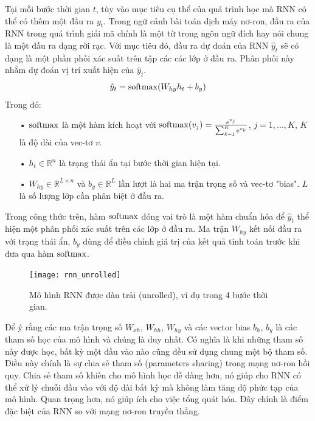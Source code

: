 Tại mỗi bước thời gian $t$, tùy vào mục tiêu cụ thể của quá trình học mà RNN có thể có thêm một đầu ra $y_t$. Trong ngữ cảnh bài toán dịch máy nơ-ron, đầu ra của RNN trong quá trình giải mã chính là một từ trong ngôn ngữ đích hay nói chung là một đầu ra dạng rời rạc. Với mục tiêu đó, đầu ra dự đoán của RNN $\hat{y}_t$ sẽ có dạng là một phần phối xác suất trên tập các các lớp ở đầu ra. Phân phối này nhằm dự đoán vị trí xuất hiện của $\hat{y}_t$.
\begin{equation} \label{rnnOuputSoftmaxDistribution}
	\hat{y}_t = \mathrm{softmax}(W_{hy}h_t + b_y)
\end{equation}
Trong đó:
\begin{itemize}
	\item[•] $\mathrm{softmax}$ là một hàm kích hoạt với $\mathrm{softmax}(v_j) = \frac{e^{v_j}}{\sum_{k=1}^{K}e^{v_k}}$, $j = 1,...,K$, $K$ là độ dài của vec-tơ $v$.
	\item[•] $h_{t} \in \mathbb{R}^n$ là trạng thái ẩn tại bước thời gian hiện tại.
	\item[•] $W_{hy} \in \mathbb{R}^{L \times n}$ và $b_y \in \mathbb{R}^L$ lần lượt là hai ma trận trọng số và vec-tơ "bias". $L$ là số lượng lớp cần phân biệt ở đầu ra.
\end{itemize}

Trong công thức trên, hàm $\mathrm{softmax}$ đóng vai trò là một hàm chuẩn hóa để $\hat{y}_t$ thể hiện một phân phối xác suất trên các lớp ở đầu ra. Ma trận $W_{hy}$ kết nối đầu ra với trạng thái ẩn, $b_y$ dùng để điều chỉnh giá trị của kết quả tính toán trước khi đưa qua hàm $\mathrm{softmax}$.

\begin{figure}
	\centering
	\texttt{[image: rnn\_unrolled]}
	\caption[Mô hình RNN dạng dàn trải]{Mô hình RNN được dàn trải (unrolled), ví dụ trong 4 bước thời gian.}
	\label{fig_rnn_unrolled}
\end{figure}

Để ý rằng các ma trận trọng số $W_{xh}$, $W_{hh}$, $W_{hy}$ và các vector bias $b_h$, $b_y$ là các tham số học của mô hình và chúng là duy nhất. Có nghĩa là khi những tham số này được học, bất kỳ một đầu vào nào cũng đều sử dụng chung một bộ tham số. Điều này chính là sự chia sẻ tham số (parameters sharing) trong mạng nơ-ron hồi quy. Chia sẻ tham số khiến cho mô hình học dễ dàng hơn, nó giúp cho RNN có thể xử lý chuỗi đầu vào với độ dài bất kỳ mà không làm tăng độ phức tạp của mô hình. Quan trọng hơn, nó giúp ích cho việc tổng quát hóa. Đây chính là điểm đặc biệt của RNN so với mạng nơ-ron truyền thẳng.

